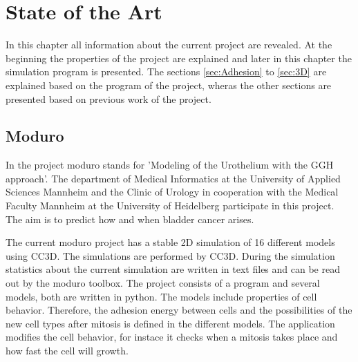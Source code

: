 \chapter{State of the Art}
In this chapter all information about the current project are revealed. At the beginning the properties of the project are explained and later in this chapter the simulation program is presented. The sections \ref{sec:Adhesion} to \ref{sec:3D} are explained based on the program of the project, wheras the other sections are presented based on previous work of the project.

\section{Moduro}
In the project moduro stands for 'Modeling of the Urothelium with the \ac{GGH} approach'. \newline
The department of Medical Informatics at the University of Applied Sciences Mannheim and the Clinic of Urology in cooperation with the Medical Faculty Mannheim at the University of Heidelberg participate in this project. The aim is to predict how and when bladder cancer arises.

The current moduro project has a stable 2D simulation of 16 different models using \ac{CC3D}. The simulations are performed by \ac{CC3D}. During the simulation statistics about the current simulation are written in text files and can be read out by the moduro toolbox. \newline
The project consists  of a program and several models, both are written in python. The models include properties of cell behavior. Therefore, the adhesion energy between cells and the possibilities of the new cell types after mitosis is defined in the different models. The application modifies the cell behavior, for instace it checks when a mitosis takes place and how fast the cell will growth.

